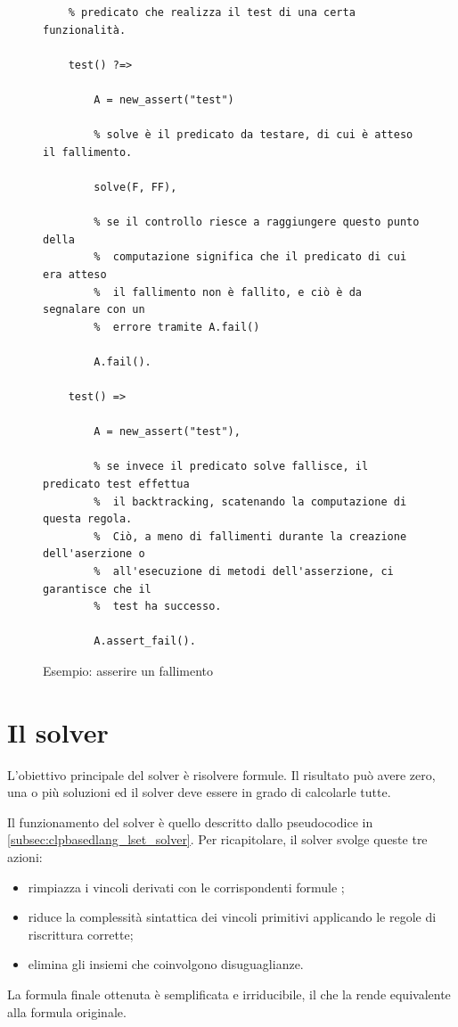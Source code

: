 \documentclass[12pt,a4paper,openright]{book} %
\begin{document}
\begin{figure}
	\begin{verbatim}
	% predicato che realizza il test di una certa funzionalità.

	test() ?=>

	    A = new_assert("test")

	    % solve è il predicato da testare, di cui è atteso il fallimento.

	    solve(F, FF),

	    % se il controllo riesce a raggiungere questo punto della
	    %  computazione significa che il predicato di cui era atteso
	    %  il fallimento non è fallito, e ciò è da segnalare con un
	    %  errore tramite A.fail()

	    A.fail().

	test() =>

	    A = new_assert("test"),

	    % se invece il predicato solve fallisce, il predicato test effettua
	    %  il backtracking, scatenando la computazione di questa regola.
	    %  Ciò, a meno di fallimenti durante la creazione dell'aserzione o
	    %  all'esecuzione di metodi dell'asserzione, ci garantisce che il
	    %  test ha successo.

	    A.assert_fail().
	\end{verbatim}
 	\caption{Esempio: asserire un fallimento}
	\label{fig:example_unittest_assertfail}
\end{figure}

\section{Il solver}
\label{sec:lsetpicat_solver}

L'obiettivo principale del solver \lset{} è risolvere formule. Il
risultato può avere zero, una o più soluzioni ed il solver deve essere
in grado di calcolarle tutte.

Il funzionamento del solver è quello descritto dallo pseudocodice in
\ref{subsec:clpbasedlang_lset_solver}. Per ricapitolare, il solver
svolge queste tre azioni:
\begin{itemize}
	\item rimpiazza i vincoli derivati con le corrispondenti
          formule \lset{};
	\item riduce la complessità sintattica dei vincoli primitivi
          applicando le regole di riscrittura corrette;
	\item elimina gli insiemi che coinvolgono disuguaglianze.
\end{itemize}
La formula finale ottenuta è semplificata e irriducibile, il che la
rende equivalente alla formula originale.
\end{document}
